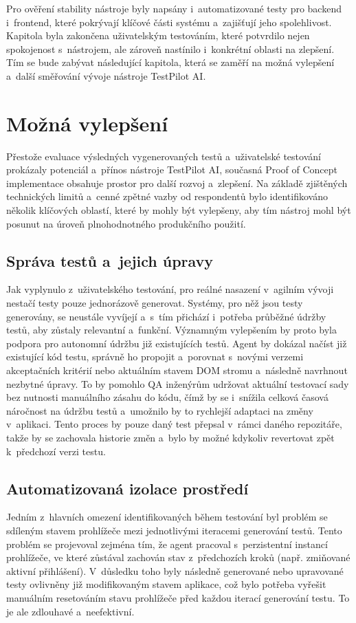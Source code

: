 \documentclass[czech, ing, kiv, he, iso690numb, viewonly]{fasthesis}
\begin{document}
Pro ověření stability nástroje byly napsány i~automatizované testy pro backend i~frontend, 
které pokrývají klíčové části systému a~zajišťují jeho spolehlivost. Kapitola byla zakončena uživatelským testováním, 
které potvrdilo nejen spokojenost s~nástrojem, ale zároveň nastínilo i~konkrétní oblasti na 
zlepšení. Tím se bude zabývat následující kapitola, která se zaměří na možná vylepšení a~další směřování vývoje nástroje TestPilot AI.

\chapter{Možná vylepšení}\label{chapter:improvements}

Přestože evaluace výsledných vygenerovaných testů a~uživatelské testování 
prokázaly potenciál a~přínos nástroje TestPilot AI, 
současná Proof of Concept implementace obsahuje prostor pro další rozvoj a~zlepšení.
Na základě zjištěných technických limitů a~cenné zpětné vazby od respondentů bylo 
identifikováno několik klíčových oblastí, které by mohly být vylepšeny, 
aby tím nástroj mohl být posunut na úroveň plnohodnotného produkčního použití.


\section{Správa testů a~jejich úpravy}
Jak vyplynulo z~uživatelského testování, pro reálné nasazení v~agilním vývoji nestačí testy pouze jednorázově generovat.
Systémy, pro něž jsou testy generovány, se neustále vyvíjejí a~s~tím přichází i~potřeba průběžné údržby testů, aby zůstaly relevantní a~funkční.
Významným vylepšením by proto byla podpora pro autonomní údržbu již existujících testů. Agent by dokázal načíst již existující kód testu,
správně ho propojit a~porovnat s~novými verzemi akceptačních kritérií nebo aktuálním stavem DOM stromu 
a~následně navrhnout nezbytné úpravy. To by pomohlo QA inženýrům udržovat 
aktuální testovací sady bez nutnosti manuálního zásahu do kódu, 
čímž by se i~snížila celková časová náročnost na údržbu testů a~umožnilo by to rychlejší adaptaci na změny v~aplikaci.
Tento proces by pouze daný test přepsal v~rámci daného repozitáře, 
takže by se zachovala historie změn a~bylo by možné kdykoliv revertovat zpět k~předchozí verzi testu.


\section{Automatizovaná izolace prostředí}
Jedním z~hlavních omezení identifikovaných během testování 
byl problém se sdíleným stavem prohlížeče mezi jednotlivými iteracemi generování testů. 
Tento problém se projevoval zejména tím, že agent pracoval s~perzistentní instancí prohlížeče, ve které 
zůstával zachován stav z~předchozích kroků (např. zmiňované aktivní přihlášení).
V~důsledku toho byly následně generované nebo upravované testy ovlivněny již modifikovaným stavem aplikace, což 
bylo potřeba vyřešit manuálním resetováním stavu prohlížeče před každou iterací generování testu.
To je ale zdlouhavé a~neefektivní.
\end{document}
